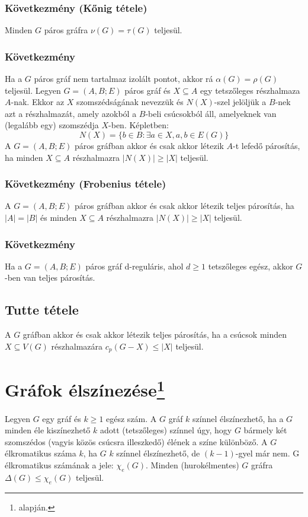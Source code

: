 \documentclass[12pt,a4paper,twoside]{report}
\begin{document}
\subsubsection{Következmény (Kőnig tétele)}
Minden $G$ páros gráfra $\nu(G) = \tau(G)$ teljesül.
\subsubsection{Következmény}
Ha a $G$ páros gráf nem tartalmaz izolált pontot, akkor rá $\alpha(G) = \rho(G)$ teljesül.
\df 
Legyen $G = (A, B; E)$ páros gráf és $X\subseteq A$ egy tetszőleges részhalmaza $A$-nak. Ekkor az $X$ szomszédságának nevezzük és $N(X)$-szel jelöljük a $B$-nek azt a részhalmazát, amely azokból a $B$-beli csúcsokból áll, amelyeknek van (legalább egy) szomszédja $X$-ben. Képletben:
 $$N(X) = \{b\in B : \exists a \in X, {a, b} \in E(G) \}$$
\ttl
	A $G = (A, B; E)$ páros gráfban akkor és csak akkor létezik $A$-t lefedő
párosítás, ha minden $X\subseteq A$ részhalmazra $|N(X)| \geq |X|$ teljesül.
\subsubsection{Következmény (Frobenius tétele)}
A $G = (A, B; E)$ páros gráfban akkor és csak akkor létezik teljes párosítás, ha
$|A| = |B|$ és minden $X \subseteq A$ részhalmazra $|N(X)| \geq |X|$ teljesül.
\subsubsection{Következmény}
Ha a $G = (A, B; E)$ páros gráf d-reguláris, ahol $d \geq 1$ tetszőleges egész, akkor $G$-ben van teljes párosítás.
\subsection{Tutte tétele}
A $G$ gráfban akkor és csak akkor létezik teljes párosítás, ha a csúcsok minden
$X\subseteq V(G)$ részhalmazára $c_p (G - X) \leq |X|$ teljesül.
\section{Gráfok élszínezése\protect\footnote{\cite{hj} alapján.}}
\df
Legyen $G$ egy gráf és $k \geq 1$ egész szám. A $G$ gráf $k$ színnel élszínezhető, ha a $G$ minden éle kiszínezhető $k$ adott (tetszőleges) színnel úgy, hogy $G$
bármely két szomszédos (vagyis közös csúcsra illeszkedő) élének a színe különböző. A $G$ élkromatikus száma $k$, ha $G$ $k$ színnel élszínezhető, de $(k - 1)$-gyel már nem. G élkromatikus számának a jele: $\chi_e(G)$.
\al 
Minden (hurokélmentes) $G$ gráfra $\Delta(G) \leq\chi_e(G)$ teljesül.
\end{document}
